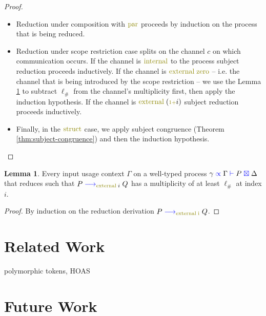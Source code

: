 \documentclass[a4paper,UKenglish,cleveref, autoref, thm-restate,authorcolumns]{lipics-v2019}
\theoremstyle{definition}
\newtheorem{nilemma}[theorem]{Lemma}
\newcommand{\type}[1]{\textcolor{blue}{\operatorname{#1}}}
\newcommand{\constr}[1]{\textcolor{olive}{\operatorname{#1}}}
\newcommand{\suc}{\constr{\scriptstyle 1+}}
\newcommand{\reduce}[1]{\; \type{\longrightarrow}_{#1} \;}
\newcommand{\types}[4]{#1 \; \type{\propto} \; #2 \; \type{\vdash} \; #3 \; \type{\boxtimes} \; #4}
\begin{document}
\begin{proof}
\begin{itemize}
    \item
    Reduction under composition with $\constr{par}$ proceeds by induction on the process that is being reduced.

    \item
    Reduction under scope restriction case splits on the channel $c$ on which communication occurs.
    If the channel is $\constr{internal}$ to the process subject reduction proceeds inductively.
    If the channel is $\constr{external}\; \constr{zero}$ -- i.e. the channel that is being introduced by the scope restriction -- we use the Lemma \ref{lm:comm-capable} to subtract $\ell_\#$ from the channel's multiplicity first, then apply the induction hypothesis.
    If the channel is $\constr{external}\; (\suc i)$ subject reduction proceeds inductively.

    \item
    Finally, in the $\constr{struct}$ case, we apply subject congruence (Theorem \ref{thm:subject-congruence}) and then the induction hypothesis.
  \end{itemize}
\end{proof}

\begin{nilemma}
  \label{lm:comm-capable}
  Every input usage context $\Gamma$ on a well-typed process $\types{\gamma}{\Gamma}{P}{\Delta}$ that reduces such that $P \reduce{\constr{external} \; i} Q$ has a multiplicity of at least $\ell_\#$ at index $i$.
\end{nilemma}
\begin{proof}
  By induction on the reduction derivation $P \reduce{\constr{external \; i}}Q$.
\end{proof}

\section{Related Work}

\cite{previous-work} polymorphic tokens, HOAS

\cite{typing-with-leftovers}

\cite{Higher-inductive-types-for-congruence}

\cite{LTS-semantics}

\cite{work-on-session-types}


\section{Future Work}
\end{document}
